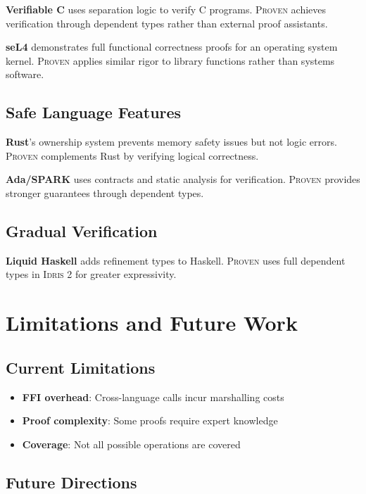 \documentclass[11pt,a4paper]{article}
\newcommand{\proven}{\textsc{Proven}}
\newcommand{\idris}{\textsc{Idris 2}}
\begin{document}
\textbf{Verifiable C} \cite{appel2014} uses separation logic to verify C programs. \proven{} achieves verification through dependent types rather than external proof assistants.

\textbf{seL4} \cite{sel4} demonstrates full functional correctness proofs for an operating system kernel. \proven{} applies similar rigor to library functions rather than systems software.

\subsection{Safe Language Features}

\textbf{Rust}'s ownership system \cite{rust} prevents memory safety issues but not logic errors. \proven{} complements Rust by verifying logical correctness.

\textbf{Ada/SPARK} \cite{spark} uses contracts and static analysis for verification. \proven{} provides stronger guarantees through dependent types.

\subsection{Gradual Verification}

\textbf{Liquid Haskell} \cite{liquidhaskell} adds refinement types to Haskell. \proven{} uses full dependent types in \idris{} for greater expressivity.

\section{Limitations and Future Work}

\subsection{Current Limitations}

\begin{itemize}
    \item \textbf{FFI overhead}: Cross-language calls incur marshalling costs
    \item \textbf{Proof complexity}: Some proofs require expert knowledge
    \item \textbf{Coverage}: Not all possible operations are covered
\end{itemize}

\subsection{Future Directions}
\end{document}
